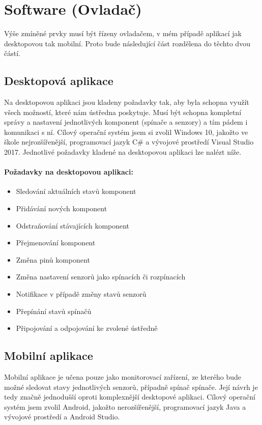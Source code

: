 \documentclass[FM,DP]{tulthesis}  %
\begin{document}
\section{Software (Ovladač)}
Výše zmíněné prvky musí  být řízeny ovladačem, v mém případě aplikací jak desktopovou tak mobilní. Proto bude následující část rozdělena do těchto dvou částí.

\subsection{Desktopová aplikace}
Na desktopovou aplikaci jsou kladeny požadavky tak, aby byla schopna využít všech možností, které nám ústředna poskytuje. Musí být schopna kompletní správy a nastavení jednotlivých komponent (spínače a senzory) a tím pádem i komunikaci s ní. Cílový operační systém jsem si zvolil Windows 10, jakožto ve škole nejrozšířenější, programovací jazyk C\# a vývojové prostředí Visual Studio 2017. Jednotlivé požadavky kladené na desktopovou aplikaci lze nalézt níže.

\paragraph{Požadavky na desktopovou aplikaci:}
\begin{itemize}
\item Sledování aktuálních stavů komponent
\item Přidávání nových komponent
\item Odstraňování stávajících komponent
\item Přejmenování komponent
\item Změna pinů komponent
\item Změna nastavení senzorů jako spínacích či rozpínacích
\item Notifikace v případě změny stavů senzorů
\item Přepínání stavů spínačů
\item Připojování a odpojování ke zvolené ústředně
\end{itemize} 

\subsection{Mobilní aplikace}
Mobilní aplikace je učena pouze jako monitorovací zařízení, ze kterého bude možné sledovat stavy jednotlivých senzorů, případně spínač spínače. Její návrh je tedy značně jednodušší oproti komplexnější desktopové aplikaci. Cílový operační systém jsem zvolil Android, jakožto nerozšířenější, programovací jazyk Java a vývojové prostředí a Android Studio.
\end{document}
